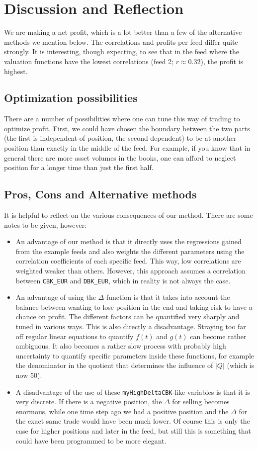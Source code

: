\documentclass[a4paper]{article}
\begin{document}
\section{Discussion and Reflection}
We are making a net profit, which is a lot better than a few of the alternative methods we mention below. The correlations and profits per feed differ quite strongly. It is interesting, though expecting, to see that in the feed where the valuation functions have the lowest correlations (feed 2; $r\approx 0.32$), the profit is highest.

\subsection{Optimization possibilities}
There are a number of possibilities where one can tune this way of trading to optimize profit. First, we could have chosen the boundary between the two parts (the first is independent of position, the second dependent) to be at another position than exactly in the middle of the feed. For example, if you know that in general there are more asset volumes in the books, one can afford to neglect position for a longer time than just the first half.

\subsection{Pros, Cons and Alternative methods}
It is helpful to reflect on the various consequences of our method. There are some notes to be given, however:
\begin{itemize}
  \setlength\itemsep{-0.3em}
\item An advantage of our method is that it directly uses the regressions gained from the example feeds and also weights the different parameters using the correlation coefficients of each specific feed. This way, low correlations are weighted weaker than others. However, this approach assumes a correlation between \texttt{CBK\_EUR} and \texttt{DBK\_EUR}, which in reality is not always the case.
\item An advantage of using the $\Delta$ function is that it takes into account the balance between wanting to lose position in the end and taking risk to have a chance on profit. The different factors can be quantified very sharply and tuned in various ways. This is also directly a disadvantage. Straying too far off regular linear equations to quantify $f(t)$ and $g(t)$ can become rather ambiguous. It also becomes a rather slow process with probably high uncertainty to quantify specific parameters inside these functions, for example the denominator in the quotient that determines the influence of $|Q|$ (which is now 50).
\item A disadvantage of the use of these \texttt{myHighDeltaCBK}-like variables is that it is very discrete. If there is a negative position, the $\Delta$ for selling becomes enormous, while one time step ago we had a positive position and the $\Delta$ for the exact same trade would have been much lower. Of course this is only the case for higher positions and later in the feed, but still this is something that could have been programmed to be more elegant.
\end{itemize}
\end{document}
